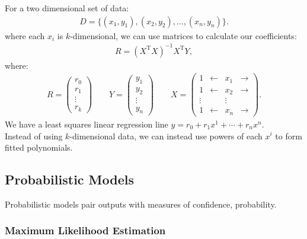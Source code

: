 \newpage

\noindent
For a two dimensional set of data: 
\begin{gather*}
    D = \{(x_1, y_1), (x_2, y_2), \ldots, (x_n, y_n)\}.
\end{gather*} where each $x_i$ is $k$-dimensional,
we can use matrices to calculate our coefficients: \begin{gather*}
    R = (X^{\text{T}}X)^{-1}X^{\text{T}}Y,
\end{gather*} where: \begin{gather*}
    R = \begin{pmatrix}
        r_0 \\ r_1 \\ \vdots \\ r_k
    \end{pmatrix} 
    \qquad
    Y = \begin{pmatrix}
        y_1 \\ y_2 \\ \vdots \\ y_n
    \end{pmatrix}
    \qquad
    X = \begin{pmatrix}
        1      & \leftarrow & x_1    & \rightarrow \\
        1      & \leftarrow & x_2    & \rightarrow \\
        \vdots &            & \vdots &             \\
        1      & \leftarrow & x_n    & \rightarrow
    \end{pmatrix}.
\end{gather*} We have a least squares linear regression line
$y = r_0 + r_1x^1 + \cdots + r_nx^n$.
\\[\baselineskip]
Instead of using $k$-dimensional data, we can instead use
powers of each $x^i$ to form fitted polynomials.

\subsection{Probabilistic Models}

Probabilistic models pair outputs with measures of confidence,
probability.

\subsubsection{Maximum Likelihood Estimation}

